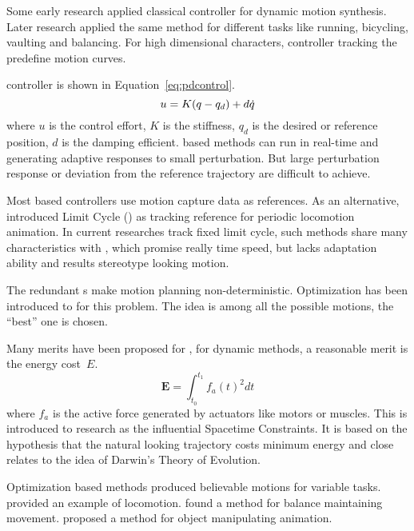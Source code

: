 \begin{itemize}




Some early research applied classical \pd controller \citep{Raibert1991} for dynamic motion synthesis.
Later research \citep{Hodgins1995} applied the same method for different tasks like running, bicycling, vaulting and balancing. 
For high dimensional characters, \pd controller tracking the predefine motion curves\citep{Yin2007}.

\pd controller is shown in Equation~\ref{eq:pdcontrol}.
\begin{equation}
\label{eq:pdcontrol}
u=K(q -q_d)+d\dot{q}
\end{equation}
where $u$ is the control effort, $K$ is the stiffness, $q_d$ is the desired or reference position, $d$ is the damping efficient.
\pd based methods can run in real-time and generating adaptive responses to small perturbation.
But large perturbation response or deviation from the reference trajectory are difficult to achieve.


Most \pd based controllers use motion capture data as references.
As an alternative, \citet{Laszlo1996} introduced Limit Cycle (\lc) as tracking reference for periodic locomotion animation. 
In current researches\citep{Coros2009,coros2010generalized,Laszlo1996} track fixed limit cycle,
such methods share many characteristics with \pd, which promise really time speed, but lacks adaptation ability and results stereotype looking motion.







The redundant \dof s make motion planning non-deterministic.
Optimization has been introduced to \cms for this problem.
The idea is among all the possible motions, the ``best'' one is chosen.

Many merits have been proposed for \cms, 
for dynamic methods, a reasonable merit is the energy cost~$E$. 
\begin{equation}
 \textbf{E}=\int_{t_0}^{t_1}f_{a}(t)^2dt
\end{equation}
where $f_{a}$ is the active force generated by actuators like motors or muscles. 
This is introduced to \cms research as the influential Spacetime Constraints\citep{Witkin1988}. 
It is based on the hypothesis that the natural looking trajectory costs minimum energy 
and close relates to the idea of Darwin's Theory of Evolution. 

Optimization based  methods produced believable motions for variable tasks. 
\citet{Jain2009} provided an example of locomotion.  
\citet{BalanceControl} found a method for balance maintaining movement. 
\citet{Liu2009} proposed a method for object manipulating animation. 
\end{itemize}


